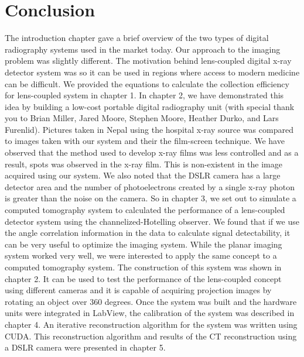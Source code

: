 \chapter{Conclusion}
The introduction chapter gave a brief overview of the two types of digital radiography systems used in the market today.  Our approach to the imaging problem was slightly different.  The motivation behind lens-coupled digital x-ray detector system was so it can be used in regions where access to modern medicine can be difficult.  We provided the equations to calculate the collection efficiency for lens-coupled system in chapter 1.  In chapter 2, we have demonstrated this idea by building a low-cost portable digital radiography unit (with special thank you to Brian Miller, Jared Moore, Stephen Moore, Heather Durko, and Lars Furenlid).  Pictures taken in Nepal using the hospital x-ray source was compared to images taken with our system and their the film-screen technique.  We have observed that the method used to develop x-ray films was less controlled and as a result, spots was observed in the x-ray film.  This is non-existent in the image acquired using our system.  We also noted that the DSLR camera has a large detector area and the number of photoelectrons created by a single x-ray photon is greater than the noise on the camera.  So in chapter 3, we set out to simulate a computed tomography system to calculated the performance of a lens-coupled detector system using the channelized-Hotelling observer.  We found that if we use the angle correlation information in the data to calculate signal detectability, it can be very useful to optimize the imaging system.  While the planar imaging system worked very well, we were interested to apply the same concept to a computed tomography system.  The construction of this system was shown in chapter 2.  It can be used to test the performance of the lens-coupled concept using different cameras and it is capable of acquiring projection images by rotating an object over 360 degrees.  Once the system was built and the hardware units were integrated in LabView, the calibration of the system was described in chapter 4.  An iterative reconstruction algorithm for the system was written using CUDA.  This reconstruction algorithm and results of the CT reconstruction using a DSLR camera were presented in chapter 5.  

